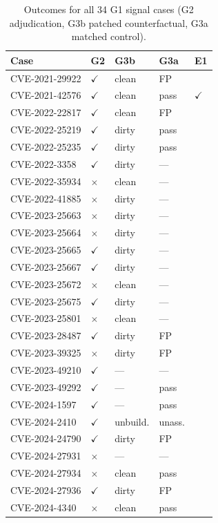 \documentclass[11pt]{article}
\begin{document}
\begin{table}[H]\centering\caption{Outcomes for all 34 G1 signal cases (G2 adjudication, G3b patched counterfactual, G3a matched control).}\label{tab:g1outcomes}\footnotesize
\begin{tabular}{@{}lllll@{}}\toprule
Case & G2 & G3b & G3a & E1 \\ \midrule
CVE-2021-29922 & $\checkmark$ & clean & FP &  \\
CVE-2021-42576 & $\checkmark$ & clean & pass & $\checkmark$ \\
CVE-2022-22817 & $\checkmark$ & clean & FP &  \\
CVE-2022-25219 & $\checkmark$ & dirty & pass &  \\
CVE-2022-25235 & $\checkmark$ & dirty & pass &  \\
CVE-2022-3358 & $\checkmark$ & dirty & --- &  \\
CVE-2022-35934 & $\times$ & clean & --- &  \\
CVE-2022-41885 & $\times$ & dirty & --- &  \\
CVE-2023-25663 & $\times$ & dirty & --- &  \\
CVE-2023-25664 & $\times$ & dirty & --- &  \\
CVE-2023-25665 & $\checkmark$ & dirty & --- &  \\
CVE-2023-25667 & $\checkmark$ & dirty & --- &  \\
CVE-2023-25672 & $\times$ & clean & --- &  \\
CVE-2023-25675 & $\checkmark$ & dirty & --- &  \\
CVE-2023-25801 & $\times$ & clean & --- &  \\
CVE-2023-28487 & $\checkmark$ & dirty & FP &  \\
CVE-2023-39325 & $\times$ & dirty & FP &  \\
CVE-2023-49210 & $\checkmark$ & --- & --- &  \\
CVE-2023-49292 & $\checkmark$ & --- & pass &  \\
CVE-2024-1597 & $\checkmark$ & --- & pass &  \\
CVE-2024-2410 & $\checkmark$ & unbuild. & unass. &  \\
CVE-2024-24790 & $\checkmark$ & dirty & FP &  \\
CVE-2024-27931 & $\times$ & --- & --- &  \\
CVE-2024-27934 & $\times$ & clean & pass &  \\
CVE-2024-27936 & $\checkmark$ & dirty & FP &  \\
CVE-2024-4340 & $\times$ & clean & pass &  \\

\end{tabular}
\end{table}
\end{document}
